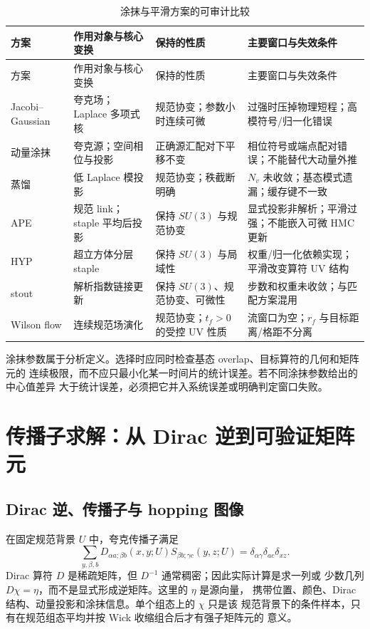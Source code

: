 \begin{longtable}{@{}p{}p{}p{}p{}@{}}
\caption{涂抹与平滑方案的可审计比较}\label{tab:b03-smearing-comparison}\\
\toprule
方案 & 作用对象与核心变换 & 保持的性质 & 主要窗口与失效条件 \\
\midrule
\endfirsthead
\toprule
方案 & 作用对象与核心变换 & 保持的性质 & 主要窗口与失效条件 \\
\midrule
\endhead
Jacobi--Gaussian & 夸克场；Laplace 多项式核 & 规范协变；参数小时连续可微 & 过强时压掉物理短程；高模符号/归一化错误 \\
动量涂抹 & 夸克源；空间相位与投影 & 正确源汇配对下平移不变 & 相位符号或端点配对错误；不能替代大动量外推 \\
蒸馏 & 低 Laplace 模投影 & 规范协变；秩截断明确 & \(N_v\) 未收敛；基态模式遗漏；缓存键不一致 \\
APE & 规范 link；staple 平均后投影 & 保持 \(SU(3)\) 与规范协变 & 显式投影非解析；平滑过强；不能嵌入可微 HMC 更新 \\
HYP & 超立方体分层 staple & 保持 \(SU(3)\) 与局域性 & 权重/归一化依赖实现；平滑改变算符 UV 结构 \\
stout & 解析指数链接更新 & 保持 \(SU(3)\)、规范协变、可微性 & 步数和权重未收敛；与匹配方案混用 \\
Wilson flow & 连续规范场演化 & 规范协变；\(t_f>0\) 的受控 UV 性质 & 流窗口为空；\(r_f\) 与目标距离/格距不分离 \\
\bottomrule
\end{longtable}

涂抹参数属于分析定义。选择时应同时检查基态 overlap、目标算符的几何和矩阵元的
连续极限，而不应只最小化某一时间片的统计误差。若不同涂抹参数给出的中心值差异
大于统计误差，必须把它并入系统误差或明确判定窗口失败。

\chapter{传播子求解：从 Dirac 逆到可验证矩阵元}
\label{sec:b03-propagator-solver}

\section{Dirac 逆、传播子与 hopping 图像}

在固定规范背景 \(U\) 中，夸克传播子满足
\begin{equation}
  \sum_{y,\beta,b}D_{\alpha a;\beta b}(x,y;U)
  S_{\beta b;\gamma c}(y,z;U)
  =\delta_{\alpha\gamma}\delta_{ac}\delta_{xz}.
  \label{eq:b03-dirac-inverse}
\end{equation}
Dirac 算符 \(D\) 是稀疏矩阵，但 \(D^{-1}\) 通常稠密；因此实际计算是求一列或
少数几列 \(D\chi=\eta\)，而不是显式形成逆矩阵。这里的 \(\eta\) 是源向量，
携带位置、颜色、Dirac 结构、动量投影和涂抹信息。单个组态上的 \(\chi\) 只是该
规范背景下的条件样本，只有在规范组态平均并按 Wick 收缩组合后才有强子矩阵元的
意义。


